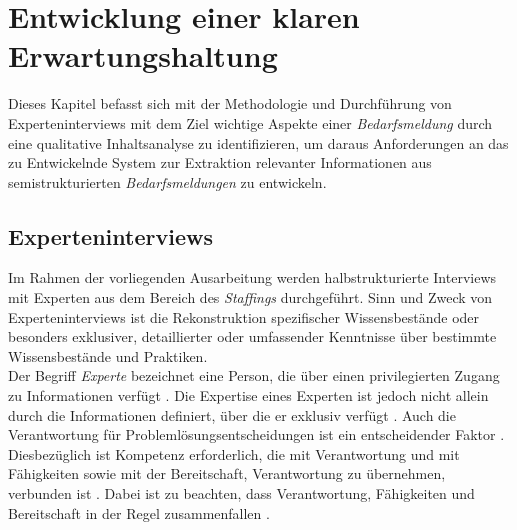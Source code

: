 \chapter{Entwicklung einer klaren Erwartungshaltung}
\label{chap:erwartungshaltung}
Dieses Kapitel befasst sich mit der Methodologie und Durchführung von Experteninterviews mit dem Ziel wichtige Aspekte einer \emph{Bedarfsmeldung} durch eine qualitative Inhaltsanalyse zu identifizieren, um daraus Anforderungen an das zu Entwickelnde System zur Extraktion relevanter Informationen aus semistrukturierten \emph{Bedarfsmeldungen} zu entwickeln.
\section{Experteninterviews}
\label{sec:beschreibung-der-interviews}
Im Rahmen der vorliegenden Ausarbeitung werden halbstrukturierte Interviews mit Experten aus dem Bereich des \emph{Staffings} durchgeführt. Sinn und Zweck von Experteninterviews ist die Rekonstruktion spezifischer Wissensbestände oder besonders exklusiver, detaillierter oder umfassender Kenntnisse über bestimmte Wissensbestände und Praktiken.\\

Der Begriff \emph{Experte} bezeichnet eine Person, die über einen privilegierten Zugang zu Informationen verfügt \cite{pfadenhauer2009eye}. Die Expertise eines Experten ist jedoch nicht allein durch die Informationen definiert, über die er exklusiv verfügt \cite{pfadenhauer2009eye}. Auch die Verantwortung für Problemlösungsentscheidungen ist ein entscheidender Faktor \cite{pfadenhauer2009eye}. Diesbezüglich ist Kompetenz erforderlich, die mit Verantwortung und mit Fähigkeiten sowie mit der Bereitschaft, Verantwortung zu übernehmen, verbunden ist \cite{pfadenhauer2009eye}. Dabei ist zu beachten, dass Verantwortung, Fähigkeiten und Bereitschaft in der Regel zusammenfallen \cite{pfadenhauer2009eye}.\\ 

